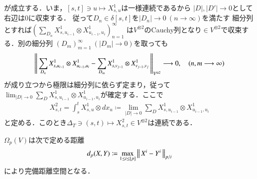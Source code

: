 	が成立する．いま，$[s,t] \ni u \longmapsto X^1_{s,u}$は一様連続であるから
	$|D|,|D'|\longrightarrow 0$として右辺は0に収束する．
	従って$D_n \in \delta[s,t]$を$|D_n| \longrightarrow 0\ (n \longrightarrow \infty)$を満たす
	細分列とすれば$\left(\sum_{D_n} X^1_{s,u_{i-1}} \otimes X^1_{u_{i-1},u_i} \right)_{n=1}^{\infty}$
	は$V^{\otimes 2}$のCauchy列となり$\in V^{\otimes 2}$で収束する．別の細分列
	$(D_m)_{m=1}^{\infty}\ (|D_m| \longrightarrow 0)$を取っても
	\begin{align}
		\left\|\,  \sum_{D_n} X^1_{s,u_{i-1}} \otimes X^1_{u_{i-1},u_i} - 
			\sum_{D_m} X^1_{s,v_{j-1}} \otimes X^1_{v_{j-1},v_j}\, \right\|_{V^{\otimes 2}}
		\longrightarrow 0,
		\quad (n,m \longrightarrow \infty)
	\end{align}
	が成り立つから極限は細分列に依らず定まり，従って
	$\lim_{|D| \to 0} \sum_{D} X^1_{s,u_{i-1}} \otimes X^1_{u_{i-1},u_i}$が確定する．ここで
	\begin{align}
		X^2_{s,t} = \int_s^t X^1_{s,u} \otimes d x_u \coloneqq 
		\lim_{|D| \to 0} \sum_{D} X^1_{s,u_{i-1}} \otimes X^1_{u_{i-1},u_i}
	\end{align}
	と定める．このとき$\Delta_T \ni (s,t) \longmapsto X^2_{s,t} \in V^{\otimes 2}$は連続である．
	
\begin{screen}
	\begin{thm}
		$\Omega_p(V)$は次で定める距離
		\begin{align}
			d_p(X,Y) \coloneqq \operatorname*{max}_{1 \leq i \leq [p]} \left\|\, X^i - Y^i\, \right\|_{p/i}
		\end{align}
		により完備距離空間となる．
	\end{thm}
\end{screen}

